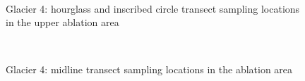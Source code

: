 \documentclass{sfuthesis}
\begin{document}
\begin{appendices}
\begin{figure}[H]
	\\
\caption[]{Glacier 4: hourglass and inscribed circle transect sampling locations in the upper ablation area}
\end{figure}
	\begin{figure}[H]
	\centering
	\\
\caption[]{Glacier 4: midline transect sampling locations in the ablation area}
\end{figure}
	\begin{figure}[H]
	\centering

\end{figure}
\end{appendices}
\end{document}
